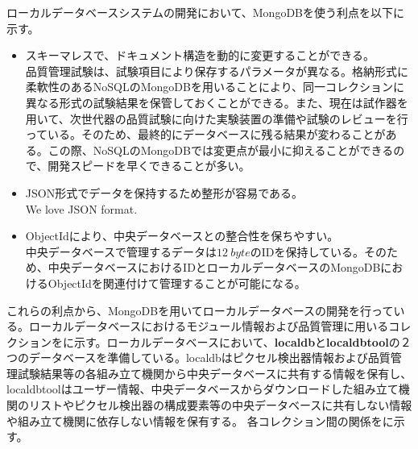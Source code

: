 ローカルデータベースシステムの開発において、MongoDBを使う利点を以下に示す。
\begin{itemize}
  \item スキーマレスで、ドキュメント構造を動的に変更することができる。 \\
  品質管理試験は、試験項目により保存するパラメータが異なる。格納形式に柔軟性のあるNoSQLのMongoDBを用いることにより、同一コレクションに異なる形式の試験結果を保管しておくことができる。また、現在は試作器を用いて、次世代器の品質試験に向けた実験装置の準備や試験のレビューを行っている。そのため、最終的にデータベースに残る結果が変わることがある。この際、NoSQLのMongoDBでは変更点が最小に抑えることができるので、開発スピードを早くできることが多い。
  \item JSON形式でデータを保持するため整形が容易である。\\
  We love JSON format.
  \item ObjectIdにより、中央データベースとの整合性を保ちやすい。 \\
  中央データベースで管理するデータは$12\ \si{byte}$のIDを保持している。そのため、中央データベースにおけるIDとローカルデータベースのMongoDBにおけるObjectIdを関連付けて管理することが可能になる。
\end{itemize}

これらの利点から、MongoDBを用いてローカルデータベースの開発を行っている。ローカルデータベースにおけるモジュール情報および品質管理に用いるコレクションをに示す。ローカルデータベースにおいて、\textbf{localdb}と\textbf{localdbtool}の２つのデータベースを準備している。localdbはピクセル検出器情報および品質管理試験結果等の各組み立て機関から中央データベースに共有する情報を保有し、localdbtoolはユーザー情報、中央データベースからダウンロードした組み立て機関のリストやピクセル検出器の構成要素等の中央データベースに共有しない情報や組み立て機関に依存しない情報を保有する。
各コレクション間の関係をに示す。

